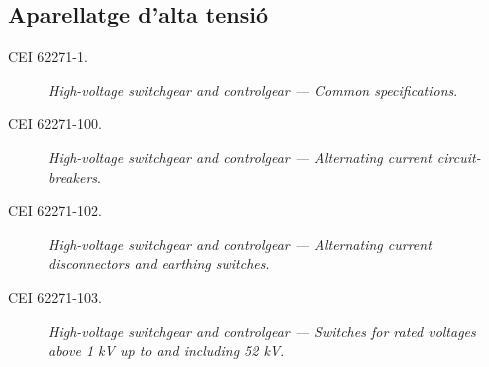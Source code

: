 \subsection*{Aparellatge d'alta tensió}
\begin{description}
    \item [\hspace{5mm}CEI 62271-1.] \textit{High-voltage switchgear and controlgear --- Common specifications}.
    \item [\hspace{5mm}CEI 62271-100.] \textit{High-voltage switchgear and controlgear --- Alternating current circuit-breakers}.
    \item [\hspace{5mm}CEI 62271-102.] \textit{High-voltage switchgear and controlgear --- Alternating current disconnectors and earthing switches}.
    \item [\hspace{5mm}CEI 62271-103.] \textit{High-voltage switchgear and controlgear --- Switches for rated voltages above 1 kV up to and including 52 kV}.
\end{description}


